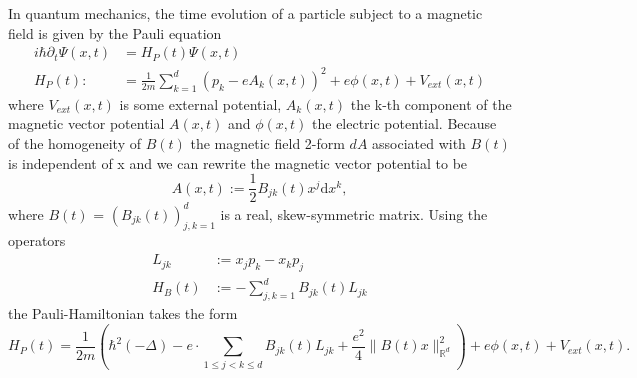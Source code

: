 \documentclass[11pt, a4paper, oneside]{article}
\begin{document}
In quantum mechanics, the time evolution of a particle subject to a magnetic field is given by the Pauli equation
\begin{align} \label{eq_pauli}
  i \hbar \partial_t \Psi(x,t) &= H_P(t)\Psi(x,t) \\
  H_P(t) :&= \frac{1}{2m} \sum_{k=1}^d (p_k - e A_k(x,t))^2 + e\phi(x,t) + V_{ext}(x,t)
\end{align}
where $V_{ext}(x,t)$ is some external potential, $A_k(x,t)$ the k-th component of the magnetic vector potential $A(x,t)$ and $\phi(x,t)$ the electric potential.
Because of the homogeneity of $B(t)$ the magnetic field 2-form $dA$ associated with $B(t)$ is independent of x and we can rewrite the magnetic vector potential to be
\begin{equation*}
  A(x,t) := \frac{1}{2}B_{jk}(t)x^j \textrm{d}x^k,
\end{equation*}
where $B(t)$ = $(B_{jk}(t))_{j,k = 1}^d$ is a real, skew-symmetric matrix. Using the operators
\begin{align}
  L_{jk} & := x_j p_k - x_k p_j \\
  H_B(t) & := - \sum_{j,k = 1}^d B_{jk}(t) L_{jk}
\end{align}
the Pauli-Hamiltonian takes the form
\begin{equation*}
  H_P(t) = \frac{1}{2 m} \left(\hbar^{2}(-\Delta)-e \cdot \sum_{1 \leqslant j<k \leqslant d} B_{j k}(t) L_{j k} +\frac{e^{2}}{4}\|B(t) x\|_{\mathbb{R}^{d}}^{2}  \right) + e \phi(x,t) + V_{ext}(x,t).
\end{equation*}
\end{document}
